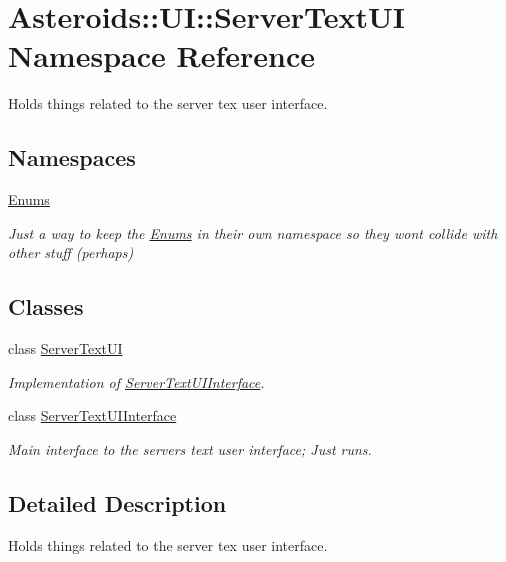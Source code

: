 \hypertarget{namespaceAsteroids_1_1UI_1_1ServerTextUI}{}\section{Asteroids\+:\+:UI\+:\+:Server\+Text\+UI Namespace Reference}
\label{namespaceAsteroids_1_1UI_1_1ServerTextUI}


Holds things related to the server tex user interface.  


\subsection*{Namespaces}
\begin{DoxyCompactItemize}
\item 
 \hyperlink{namespaceAsteroids_1_1UI_1_1ServerTextUI_1_1Enums}{Enums}
\begin{DoxyCompactList}\small\item\em Just a way to keep the \hyperlink{namespaceAsteroids_1_1UI_1_1ServerTextUI_1_1Enums}{Enums} in their own namespace so they won\textquotesingle{}t collide with other stuff (perhaps) \end{DoxyCompactList}\end{DoxyCompactItemize}
\subsection*{Classes}
\begin{DoxyCompactItemize}
\item 
class \hyperlink{classAsteroids_1_1UI_1_1ServerTextUI_1_1ServerTextUI}{Server\+Text\+UI}
\begin{DoxyCompactList}\small\item\em Implementation of \hyperlink{classAsteroids_1_1UI_1_1ServerTextUI_1_1ServerTextUIInterface}{Server\+Text\+U\+I\+Interface}. \end{DoxyCompactList}\item 
class \hyperlink{classAsteroids_1_1UI_1_1ServerTextUI_1_1ServerTextUIInterface}{Server\+Text\+U\+I\+Interface}
\begin{DoxyCompactList}\small\item\em Main interface to the server\textquotesingle{}s text user interface; Just runs. \end{DoxyCompactList}\end{DoxyCompactItemize}


\subsection{Detailed Description}
Holds things related to the server tex user interface. 